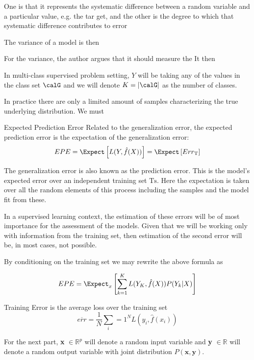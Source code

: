  One is that it represents the systematic difference between a random
 variable and a particular value, e.g. the tar get, and the other is the degree
 to which that systematic difference contributes to error
 
 The variance of a model is then 
 
 For the variance, the author argues that it should measure the 
 It then 
 
 In multi-class supervised problem setting, $Y$ will be taking any of the values in the class set $\calG$ and we will denote $K = |\calG|$ as the number of classes.
 
 
 In practice there are only a limited amount of samples characterizing the true underlying distribution. We must 
 
 \begin{definition}{Expected Prediction Error}
 	Related to the generalization error, the expected prediction error is the expectation of the generalization error:
 	$$ EPE = \Expect \left[ L(Y,\hat{f}(X))\right] =  \Expect \left[ Err_{\mathrm{T}}  \right]$$
 \end{definition}
 
 The generalization error is also known as the prediction error. This is the model's expected error over an independent training set $\mathrm{Ts}$. Here the expectation is taken over all the random elements of this process including the samples and the model fit from these. 
 
 In a supervised learning context, the estimation of these errors will be of most importance for the assessment of the models.  Given  that we will be working only with information from the training set, then estimation of the second error will be, in most cases, not possible.
 
 By conditioning on the training set we may rewrite the above formula as 
 
 \begin{equation}\label{classificationEPE}
 EPE = \Expect_x\left[ \sum_{k=1}^{K} L( Y_K , \hat{f}(X) ) P(Y_k|X) \right]
 \end{equation}
 
 
 \begin{definition}{Training Error}
 	is the average loss over the training set
 	$$ \overline{err} = \frac{1}{N} \sum_i=1^N L(y_i, \hat{f}(x_i) )$$
 \end{definition}
 
 
 For the next part, \textbf{x} $\in \mathbb{R}^{p}$ will denote a random input variable and \textbf{y}  $\in \mathbb{R}$ will denote a random output variable with joint distribution $P\left(\textbf{x},\textbf{y}\right)$.
 
